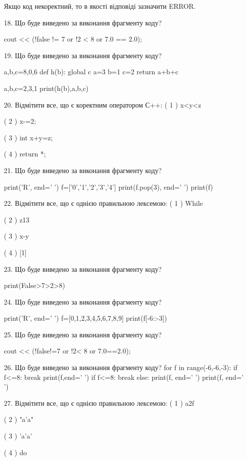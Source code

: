 \documentclass[11pt]{article}
\begin{document}
Якщо код некоректний, то в якості відповіді зазначити ERROR.



18. Що буде виведено за виконання фрагменту коду?

cout << (!false != 7 or !2 < 8 or 7.0 == 2.0);

19. Що буде виведено за виконання фрагменту коду?

a,b,c=8,0,6
def h(b):
global c    a=3
    b=1
    c=2
    return a+b+c

a,b,c=2,3,1
print(h(b),a,b,c)

20. Відмітити все, що є коректним оператором С++:
( 1 ) x<y<z

( 2 ) x-=2;

( 3 ) int x+y=z;

( 4 ) return *;

21. Що буде виведено за виконання фрагменту коду?

print('R', end=' ')
f=['0','1','2','3','4']
print(f.pop(3), end=' ')
print(f)


22. Відмітити все, що є однією правильною лексемою:
( 1 ) While

( 2 ) z13

( 3 ) x-y

( 4 ) [1]

23. Що буде виведено за виконання фрагменту коду?

print(False>7>2>8)

24. Що буде виведено за виконання фрагменту коду?

print('R', end=' ')
f=[0,1,2,3,4,5,6,7,8,9]
print(f[-6::-3])


25. Що буде виведено за виконання фрагменту коду?

cout << (!false!=7 or !2< 8 or 7.0==2.0);

26. Що буде виведено за виконання фрагменту коду?
for f in range(-6,-6,-3):
    if f<=8:
        break
        print(f,end=' ')
    if f<=8:
        break
else:
    print(f, end=' ')
print(f, end=' ')

27. Відмітити все, що є однією правильною лексемою:
( 1 ) a2f

( 2 ) "a'a"

( 3 ) 'a'a'

( 4 ) do
\end{document}
